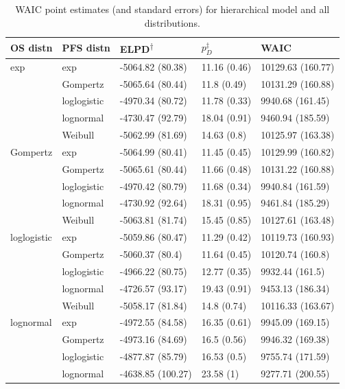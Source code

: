 \documentclass[AMA,STIX1COL]{WileyNJD-v2}
\begin{document}
\begin{table}[!ht]
\centering
\caption{WAIC point estimates (and standard errors) for hierarchical model and all distributions. \label{tab:waic_hier}}
\begin{tabular}{l|l|l|l|l}
\hline
\textbf{OS distn} & \textbf{PFS distn} & \textbf{ELPD\textsuperscript{$\dagger$}} & \textbf{$p_D^{\ddagger}$} & \textbf{WAIC} \\
\hline
exp & exp & -5064.82 (80.38) & 11.16 (0.46) & 10129.63 (160.77)\\
\hline
 & Gompertz & -5065.64 (80.44) & 11.8 (0.49) & 10131.29 (160.88)\\
\hline
 & loglogistic & -4970.34 (80.72) & 11.78 (0.33) & 9940.68 (161.45)\\
\hline
 & lognormal & -4730.47 (92.79) & 18.04 (0.91) & 9460.94 (185.59)\\
\hline
 & Weibull & -5062.99 (81.69) & 14.63 (0.8) & 10125.97 (163.38)\\
\hline
Gompertz & exp & -5064.99 (80.41) & 11.45 (0.45) & 10129.99 (160.82)\\
\hline
 & Gompertz & -5065.61 (80.44) & 11.66 (0.48) & 10131.22 (160.88)\\
\hline
 & loglogistic & -4970.42 (80.79) & 11.68 (0.34) & 9940.84 (161.59)\\
\hline
 & lognormal & -4730.92 (92.64) & 18.31 (0.95) & 9461.84 (185.29)\\
\hline
 & Weibull & -5063.81 (81.74) & 15.45 (0.85) & 10127.61 (163.48)\\
\hline
loglogistic & exp & -5059.86 (80.47) & 11.29 (0.42) & 10119.73 (160.93)\\
\hline
 & Gompertz & -5060.37 (80.4) & 11.64 (0.45) & 10120.74 (160.8)\\
\hline
 & loglogistic & -4966.22 (80.75) & 12.77 (0.35) & 9932.44 (161.5)\\
\hline
 & lognormal & -4726.57 (93.17) & 19.43 (0.91) & 9453.13 (186.34)\\
\hline
 & Weibull & -5058.17 (81.84) & 14.8 (0.74) & 10116.33 (163.67)\\
\hline
lognormal & exp & -4972.55 (84.58) & 16.35 (0.61) & 9945.09 (169.15)\\
\hline
 & Gompertz & -4973.16 (84.69) & 16.5 (0.56) & 9946.32 (169.38)\\
\hline
 & loglogistic & -4877.87 (85.79) & 16.53 (0.5) & 9755.74 (171.59)\\
\hline
 & lognormal & -4638.85 (100.27) & 23.58 (1) & 9277.71 (200.55)\\

\end{tabular}
\end{table}
\end{document}
